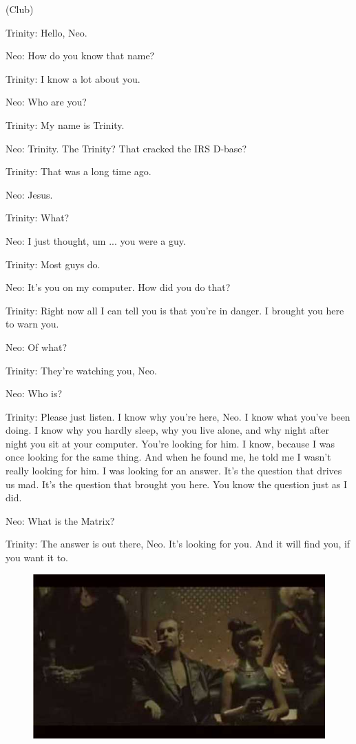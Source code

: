 \documentclass[UTF8]{ctexart}
\newenvironment{myquote}{\color{green} \setlength{\leftskip}{6em} \setlength{\rightskip}{4em} \setlength{\parindent}{-2em}}{\par}
\begin{document}
\begin{myquote}
(Club)

Trinity: Hello, Neo.

Neo: How do you know that name?

Trinity: I know a lot about you.

Neo: Who are you?

Trinity: My name is Trinity.

Neo: Trinity. The Trinity? That cracked the IRS D-base?

Trinity: That was a long time ago.

Neo: Jesus.

Trinity: What?

Neo: I just thought, um ... you were a guy.

Trinity: Most guys do.

Neo: It's you on my computer. How did you do that?

Trinity: Right now all I can tell you is that you're in danger. I brought you here to warn you.

Neo: Of what?

Trinity: They're watching you, Neo.

Neo: Who is?

Trinity: Please just listen. I know why you're here, Neo. I know what you've been doing. I know why you hardly sleep, why you live alone, and why night after night you sit at your computer. You're looking for him. I know, because I was once looking for the same thing. And when he found me, he told me I wasn't really looking for him. I was looking for an answer. It's the question that drives us mad. It's the question that brought you here. You know the question just as I did.

Neo: What is the Matrix?

Trinity: The answer is out there, Neo. It's looking for you. And it will find you, if you want it to.
\end{myquote}

\begin{figure}[htb]
\centering
\includegraphics[width=0.5\linewidth]{fig/read_Matrix-5}
\end{figure}
\end{document}
